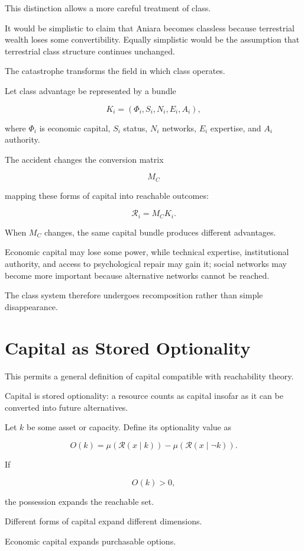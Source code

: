\documentclass[11pt,oneside]{book}
\theoremstyle{definition}
\theoremstyle{remark}
\newcommand{\R}{\mathcal{R}}
\begin{document}
This distinction allows a more careful treatment of class.

It would be simplistic to claim that Aniara becomes classless because terrestrial wealth loses some convertibility. Equally simplistic would be the assumption that terrestrial class structure continues unchanged.

The catastrophe transforms the field in which class operates.

Let class advantage be represented by a bundle

\[
K_i
=
(\Phi_i,S_i,N_i,E_i,A_i),
\]

where \(\Phi_i\) is economic capital, \(S_i\) status, \(N_i\) networks, \(E_i\) expertise, and \(A_i\) authority.

The accident changes the conversion matrix

\[
M_C
\]

mapping these forms of capital into reachable outcomes:

\[
\R_i
=
M_CK_i.
\]

When \(M_C\) changes, the same capital bundle produces different advantages.

Economic capital may lose some power, while technical expertise, institutional authority, and access to psychological repair may gain it; social networks may become more important because alternative networks cannot be reached.

The class system therefore undergoes recomposition rather than simple disappearance.

\section{Capital as Stored Optionality}

This permits a general definition of capital compatible with reachability theory.

Capital is stored optionality: a resource counts as capital insofar as it can be converted into future alternatives.

Let \(k\) be some asset or capacity. Define its optionality value as

\[
O(k)
=
\mu(\R(x\mid k))
-
\mu(\R(x\mid\neg k)).
\]

If

\[
O(k)>0,
\]

the possession expands the reachable set.

Different forms of capital expand different dimensions.

Economic capital expands purchasable options.
\end{document}
